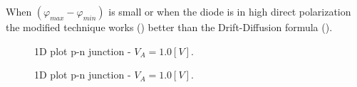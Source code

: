 When $(\varphi_{max}-\varphi_{min})$ is small or when the diode is in high direct polarization the modified technique works () better than the Drift-Diffusion formula ().

\begin{figure}[!h]
\centering
{}
\caption{1D plot p-n junction - $V_A=1.0[V]$.}
\label{fig: p-n upwinding tech}
\end{figure} 

\begin{figure}[!h]
\centering
{}
\caption{1D plot p-n junction - $V_A=1.0[V]$.}
\label{fig: p-n drift diffusion}
\end{figure} 